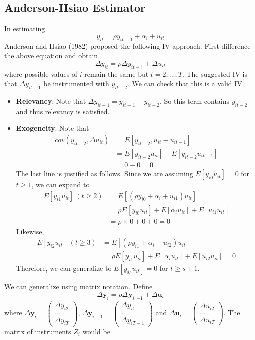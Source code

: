 \documentclass[12pt]{article}
\theoremstyle{definition}
\theoremstyle{property}
\theoremstyle{assumption}
\theoremstyle{example}
\theoremstyle{comment}
\begin{document}
\subsection{Anderson-Hsiao Estimator}
In estimating 
\[
y_{it}=\rho y_{it-1}+\alpha_i +u_{it}
\]
Anderson and Hsiao (1982) proposed the following IV approach. First difference the above equation and obtain
\[
\Delta y_{it}=\rho\Delta  y_{it-1} +\Delta u_{it}
\]
where possible values of $i$ remain the same but $t=2,...,T$. The suggested IV is that $\Delta y_{it-1}$ be instrumented with $y_{it-2}$. We can check that this is a valid IV. 
\begin{itemize}
\item \textbf{Relevancy}: Note that $\Delta y_{it-1}= y_{it-1}-y_{it-2}$. So this term contains $y_{it-2}$ and thus relevancy is satisfied.
\item \textbf{Exogeneity}: Note that
\begin{align*}
cov(y_{it-2},\Delta u_{it})&=E[y_{it-2}, u_{it}-u_{it-1}]\\
&=E[y_{it-2}u_{it}]-E[y_{it-2}u_{it-1}]\\
&=0-0=0
\end{align*}
The last line is justified as follows. Since we are assuming $E[y_{i0}u_{it}]=0$ for $t\geq1$, we can expand to
\begin{align*}
E[y_{i1}u_{it}]\ (t\geq 2)&=E[(\rho y_{i0}+\alpha_i +u_{i1})u_{it}]\\
&=\rho E[y_{i0}u_{it}]+E[\alpha_iu_{it}]+E[u_{i1}u_{it}]\\
&=\rho\times0+0+0=0
\end{align*}
Likewise, 
\begin{align*}
E[y_{i2}u_{it}]\ (t\geq 3)&=E[(\rho y_{i1}+\alpha_i +u_{i2})u_{it}]\\
&=\rho E[y_{i1}u_{it}]+E[\alpha_iu_{it}]+E[u_{i2}u_{it}]=0
\end{align*}
Therefore, we can generalize to $E[y_{is}u_{it}]=0$ for $t\geq s+1$. 
\end{itemize}
We can generalize using matrix notation. Define
\[
\Delta \mathbf{y}_i = \rho\Delta\mathbf{y}_{i,-1}+\Delta \mathbf{u}_i
\]
where $\Delta \mathbf{y}_i=\begin{pmatrix} \Delta y_{i2}\\ ...\\ \Delta y_{iT} \end{pmatrix}$, $\Delta \mathbf{y}_{i,-1}=\begin{pmatrix} \Delta y_{i1}\\ ...\\ \Delta y_{iT-1} \end{pmatrix}$ and $\Delta \mathbf{u}_i=\begin{pmatrix} \Delta u_{i2}\\ ...\\ \Delta u_{iT} \end{pmatrix}$. The matrix of instruments $Z_i$ would be
\end{document}
